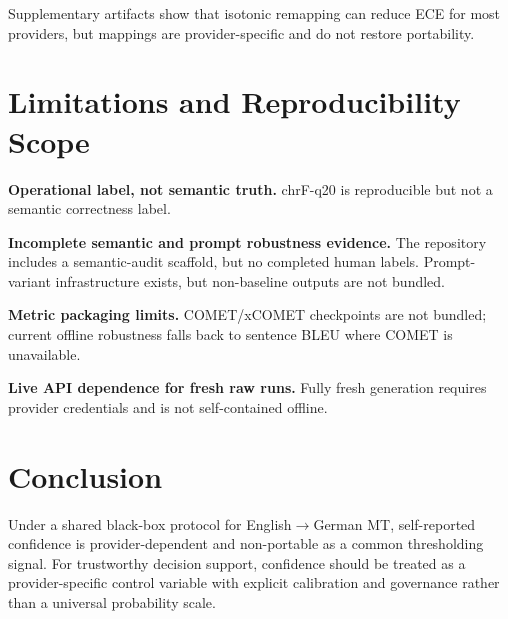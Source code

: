\documentclass[10pt,conference]{IEEEtran}
\begin{document}
Supplementary artifacts show that isotonic remapping can reduce ECE for most providers, but mappings are provider-specific and do not restore portability.

\section{Limitations and Reproducibility Scope}
\textbf{Operational label, not semantic truth.} chrF-q20 is reproducible but not a semantic correctness label.

\textbf{Incomplete semantic and prompt robustness evidence.} The repository includes a semantic-audit scaffold, but no completed human labels. Prompt-variant infrastructure exists, but non-baseline outputs are not bundled.

\textbf{Metric packaging limits.} COMET/xCOMET checkpoints are not bundled; current offline robustness falls back to sentence BLEU where COMET is unavailable.

\textbf{Live API dependence for fresh raw runs.} Fully fresh generation requires provider credentials and is not self-contained offline.

\section{Conclusion}
Under a shared black-box protocol for English$\rightarrow$German MT, self-reported confidence is provider-dependent and non-portable as a common thresholding signal. For trustworthy decision support, confidence should be treated as a provider-specific control variable with explicit calibration and governance rather than a universal probability scale.



\end{document}
